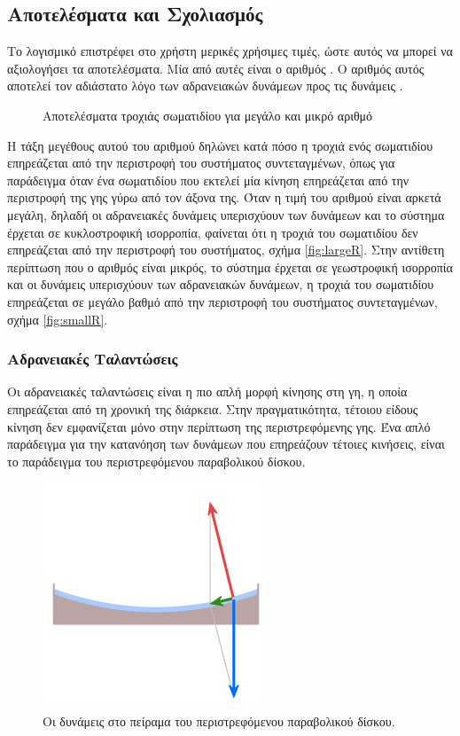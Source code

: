 \subsection{Αποτελέσματα και Σχολιασμός}
Το λογισμικό επιστρέφει στο χρήστη μερικές χρήσιμες τιμές, ώστε αυτός να μπορεί να αξιολογήσει τα αποτελέσματα. Μία από αυτές είναι ο αριθμός \ros. Ο αριθμός αυτός αποτελεί τον αδιάστατο λόγο των αδρανειακών δυνάμεων προς τις δυνάμεις . 
\begin{figure}[H]
	\centering     %
	\caption{Αποτελέσματα τροχιάς σωματιδίου για μεγάλο και μικρό αριθμό }
\end{figure}
Η τάξη μεγέθους αυτού του αριθμού δηλώνει κατά πόσο η τροχιά ενός σωματιδίου επηρεάζεται από την περιστροφή του συστήματος συντεταγμένων, όπως για παράδειγμα όταν ένα σωματιδίου που εκτελεί μία κίνηση επηρεάζεται από την περιστροφή της γης γύρω από τον άξονα της. Όταν η τιμή του αριθμού  είναι αρκετά μεγάλη, δηλαδή οι αδρανειακές δυνάμεις υπερισχύουν των δυνάμεων  και το σύστημα έρχεται σε κυκλοστροφική ισορροπία, φαίνεται ότι η τροχιά του σωματιδίου δεν επηρεάζεται από την περιστροφή του συστήματος, σχήμα \ref{fig:largeR}. Στην αντίθετη περίπτωση που ο αριθμός \ros είναι μικρός, το σύστημα έρχεται σε γεωστροφική ισορροπία και οι δυνάμεις \cor υπερισχύουν των αδρανειακών δυνάμεων, η τροχιά του σωματιδίου επηρεάζεται σε μεγάλο βαθμό από την περιστροφή του συστήματος συντεταγμένων, σχήμα \ref{fig:smallR}.

\subsubsection{Αδρανειακές Ταλαντώσεις}
Οι αδρανειακές ταλαντώσεις είναι η πιο απλή μορφή κίνησης στη γη, η οποία επηρεάζεται από τη χρονική της διάρκεια. Στην πραγματικότητα, τέτοιου είδους κίνηση δεν εμφανίζεται μόνο στην περίπτωση της περιστρεφόμενης γης. Ένα απλό παράδειγμα για την κατανόηση των δυνάμεων που επηρεάζουν τέτοιες κινήσεις, είναι το παράδειγμα του περιστρεφόμενου παραβολικού δίσκου.
\begin{figure}[ht]
	\centering
	\includegraphics[scale=0.7]{images/coriolis-parabolic-disk.png}
	\caption{Οι δυνάμεις στο πείραμα του περιστρεφόμενου παραβολικού δίσκου. }
	\label{fig:coriolis-parbolic-disk}
\end{figure}

